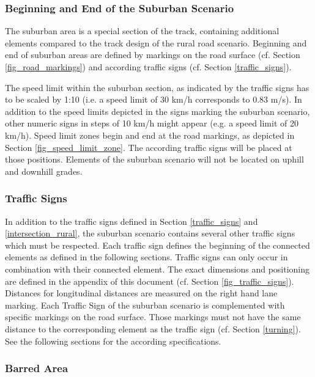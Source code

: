 \documentclass[a4paper]{report}
\begin{document}
{{\subsubsection{Beginning and End of the Suburban Scenario}

The suburban area is a special section of the track, containing additional elements compared to the track design of the rural road scenario. Beginning and end of suburban areas are defined by markings on the road surface (cf. Section \ref{fig_road_markings}) and according traffic signs (cf. Section \ref{traffic_signs}). 

The speed limit within the suburban section, as indicated by the traffic signs has to be scaled by 1:10 (i.e. a speed limit of 30 km/h corresponds to 0.83 m/s). In addition to the speed limits depicted in the signs marking the suburban scenario, other numeric signs in steps of 10 km/h might appear (e.g. a speed limit of 20 km/h). Speed limit zones begin and end at the road markings, as depicted in Section \ref{fig_speed_limit_zone}. The according traffic signs will be placed at those positions. Elements of the suburban scenario will not be located on uphill and downhill grades. 

\subsubsection{Traffic Signs}

In addition to the traffic signs defined in Section \ref{traffic_signs} and \ref{intersection_rural}, the suburban scenario contains several other traffic signs which must be respected. Each traffic sign defines the beginning of the connected elements as defined in the following sections. Traffic signs can only occur in combination with their connected element. The exact dimensions and positioning are defined in the appendix of this document (cf. Section \ref{fig_traffic_signs}). Distances for longitudinal distances are measured on the right hand lane marking. Each Traffic Sign of the suburban scenario is complemented with specific markings on the road surface. Those markings must not have the same distance to the corresponding element as the traffic sign (cf. Section \ref{turning}). See the following sections for the according specifications. 

\subsubsection{Barred Area}

}}
\end{document}
